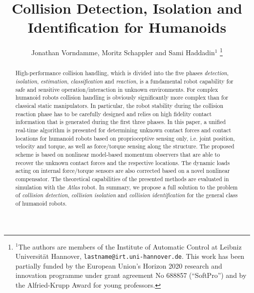 
\title{\LARGE \bf
Collision Detection, Isolation and Identification for Humanoids
}

\author{Jonathan Vorndamme, Moritz Schappler and Sami Haddadin$^{1}$
\thanks{$^{1}$The authors are members of the Institute of Automatic Control at Leibniz Universit\"at Hannover, {\tt\small lastname@irt.uni-hannover.de}.
\newline
This work has been partially funded by the
European Union’s Horizon 2020 research and innovation programme under grant agreement No 688857 (``SoftPro'') and by the Alfried-Krupp Award for young professors.}
}



\maketitle
\thispagestyle{empty}
\pagestyle{empty}


\begin{abstract}
High-performance collision handling, which is divided into the five phases \emph{detection}, \emph{isolation}, \emph{estimation}, \emph{classification} and \emph{reaction}, is a fundamental robot capability for safe and sensitive operation/interaction in unknown environments.
For complex humanoid robots collision handling is obviously significantly more complex than for classical static manipulators. 
In particular, the robot stability during the collision reaction phase has to be carefully designed and relies on high fidelity contact information that is generated during the first three phases. 
In this paper, a unified real-time algorithm is presented for determining unknown contact forces and contact locations for humanoid robots based on proprioceptive sensing only, i.e. joint position, velocity and torque, as well as force/torque sensing along the structure. 
The proposed scheme is based on nonlinear model-based momentum observers that are able to recover the unknown contact forces and the respective locations.
The dynamic loads acting on internal force/torque sensors are also corrected based on a novel nonlinear compensator. 
The theoretical capabilities of the presented methods are evaluated in simulation with the \emph{{A}tlas} robot.
In summary, we propose a full solution to the problem of \emph{collision detection}, \emph{collision isolation} and \emph{collision identification} for the general class of humanoid robots. 

\end{abstract}


